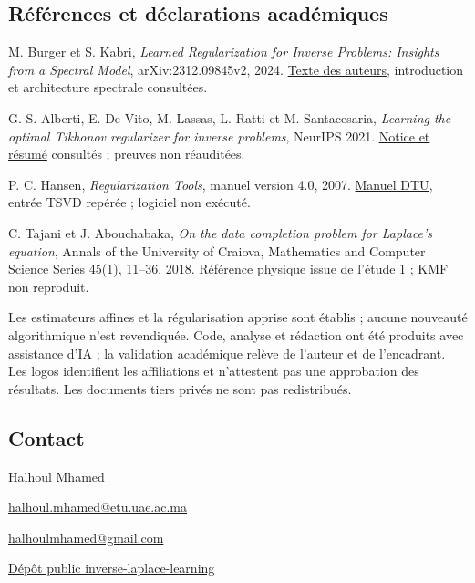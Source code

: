 \documentclass[11pt,a4paper]{article}
\begin{document}
\subsection*{Références et déclarations académiques}
M. Burger et S. Kabri, \emph{Learned Regularization for Inverse Problems: Insights from a Spectral Model}, arXiv:2312.09845v2, 2024. \href{https://arxiv.org/html/2312.09845v2}{Texte des auteurs}, introduction et architecture spectrale consultées.

G. S. Alberti, E. De Vito, M. Lassas, L. Ratti et M. Santacesaria, \emph{Learning the optimal Tikhonov regularizer for inverse problems}, NeurIPS 2021. \href{https://papers.nips.cc/paper_files/paper/2021/hash/d3e6cd9f66f2c1d3840ade4161cf7406-Abstract.html}{Notice et résumé} consultés ; preuves non réauditées.

P. C. Hansen, \emph{Regularization Tools}, manuel version 4.0, 2007. \href{https://www.imm.dtu.dk/~pcha/Regutools/RTv4manual.pdf}{Manuel DTU}, entrée TSVD repérée ; logiciel non exécuté.

C. Tajani et J. Abouchabaka, \emph{On the data completion problem for Laplace's equation}, Annals of the University of Craiova, Mathematics and Computer Science Series 45(1), 11--36, 2018. Référence physique issue de l'étude 1 ; KMF non reproduit.

Les estimateurs affines et la régularisation apprise sont établis ; aucune nouveauté algorithmique n'est revendiquée. Code, analyse et rédaction ont été produits avec assistance d'IA ; la validation académique relève de l'auteur et de l'encadrant. Les logos identifient les affiliations et n'attestent pas une approbation des résultats. Les documents tiers privés ne sont pas redistribués.

\subsection*{Contact}
Halhoul Mhamed\par
\href{mailto:halhoul.mhamed@etu.uae.ac.ma}{halhoul.mhamed@etu.uae.ac.ma}\par
\href{mailto:halhoulmhamed@gmail.com}{halhoulmhamed@gmail.com}\par
\href{https://github.com/halhoulmhamed-droid/inverse-laplace-learning}{Dépôt public inverse-laplace-learning}
\end{document}
